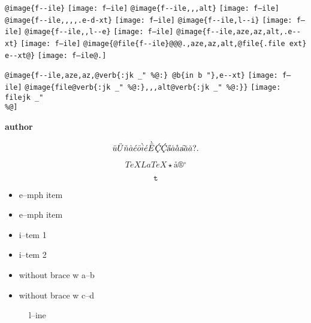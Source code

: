 \documentclass{book}
\renewcommand{\includegraphics}[1]{\fbox{FIG \detokenize{#1}}}
\begin{document}
\begin{titlepage}
\texttt{@image\{f{-}{-}ile\}} \texttt{[image: f--ile]}
\texttt{@image\{f{-}{-}ile{,}{,},alt\}} \texttt{[image: f--ile]}
\texttt{@image\{f{-}{-}ile{,}{,}{,}{,}.e-d-xt\}} \texttt{[image: f--ile]}
\texttt{@image\{f{-}{-}ile,l{-}{-}i\}} \texttt{[image: f--ile]}
\texttt{@image\{f{-}{-}ile{,}{,}l{-}{-}e\}} \texttt{[image: f--ile]}
\texttt{@image\{f{-}{-}ile,aze,az,alt,.e{-}{-}xt\}} \texttt{[image: f--ile]}
\texttt{@image\{@file\{f{-}{-}ile\}@@@.,aze,az,alt,@file\{.file ext\} e{-}{-}xt@\}} \texttt{[image: f--ile@.]}

\texttt{@image\{f{-}{-}ile,aze,az,@verb\{:jk \_" \%@:\} @b\{in b "\},e{-}{-}xt\}} \texttt{[image: f--ile]}
\texttt{@image\{file@verb\{:jk \_" \%@:\}{,}{,},alt@verb\{:jk \_" \%@:\}\}} \texttt{[image: filejk \_" \\\%@]}


{\bfseries author}%

$$
\ddot{u} \ddot{U} \tilde{n} \hat{a} \acute{e} \bar{o} \grave{i} \acute{e} \grave{\bar{E}}
\textsl{\c{\'{C}}} \textsl{\c{\'{C}}} \textsl{\H{a}} \dot{a} \mathring{a} \textsl{\t{a}}
\breve{a} \check{a}
 ? .
$$

$$
TeX LaTeX \star{} \mathord{\text{\aa{}}} \circledR{} ^{\circ{}} 
$$

$$
\mathtt{t} 
$$

\begin{itemize}[label=\emph{}]
\item e--mph item
\end{itemize}

\begin{itemize}[label=\emph{} after emph]
\item e--mph item
\end{itemize}

\begin{itemize}[label=\textbullet{} a--n itemize line]
\item i--tem 1
\item i--tem 2
\end{itemize}

\begin{itemize}[label={}]
\item without brace w a--b
\item without brace w c--d
\end{itemize}

\begin{description}
\item[{\parbox[b]{\linewidth}{%
a}}]
l--ine
\end{description}


\end{titlepage}
\end{document}
